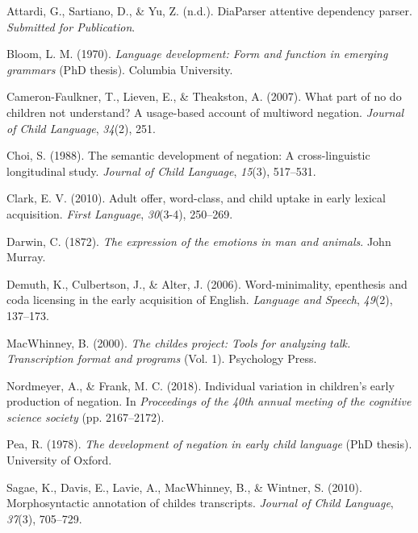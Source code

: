 \documentclass[
  english,
  man,floatsintext]{apa6}
\begin{document}
\endgroup

\hypertarget{refs}{}
\leavevmode\hypertarget{ref-diaparser}{}%
Attardi, G., Sartiano, D., \& Yu, Z. (n.d.). DiaParser attentive dependency parser. \emph{Submitted for Publication}.

\leavevmode\hypertarget{ref-bloom1970language}{}%
Bloom, L. M. (1970). \emph{Language development: Form and function in emerging grammars} (PhD thesis). Columbia University.

\leavevmode\hypertarget{ref-cameron2007part}{}%
Cameron-Faulkner, T., Lieven, E., \& Theakston, A. (2007). What part of no do children not understand? A usage-based account of multiword negation. \emph{Journal of Child Language}, \emph{34}(2), 251.

\leavevmode\hypertarget{ref-choi1988semantic}{}%
Choi, S. (1988). The semantic development of negation: A cross-linguistic longitudinal study. \emph{Journal of Child Language}, \emph{15}(3), 517--531.

\leavevmode\hypertarget{ref-clark2010adult}{}%
Clark, E. V. (2010). Adult offer, word-class, and child uptake in early lexical acquisition. \emph{First Language}, \emph{30}(3-4), 250--269.

\leavevmode\hypertarget{ref-darwin1872expression}{}%
Darwin, C. (1872). \emph{The expression of the emotions in man and animals}. John Murray.

\leavevmode\hypertarget{ref-demuth2006word}{}%
Demuth, K., Culbertson, J., \& Alter, J. (2006). Word-minimality, epenthesis and coda licensing in the early acquisition of English. \emph{Language and Speech}, \emph{49}(2), 137--173.

\leavevmode\hypertarget{ref-macwhinney2000childes}{}%
MacWhinney, B. (2000). \emph{The childes project: Tools for analyzing talk. Transcription format and programs} (Vol. 1). Psychology Press.

\leavevmode\hypertarget{ref-nordmeyer2018individual}{}%
Nordmeyer, A., \& Frank, M. C. (2018). Individual variation in children's early production of negation. In \emph{Proceedings of the 40th annual meeting of the cognitive science society} (pp. 2167--2172).

\leavevmode\hypertarget{ref-pea1978}{}%
Pea, R. (1978). \emph{The development of negation in early child language} (PhD thesis). University of Oxford.

\leavevmode\hypertarget{ref-sagae2010morphosyntactic}{}%
Sagae, K., Davis, E., Lavie, A., MacWhinney, B., \& Wintner, S. (2010). Morphosyntactic annotation of childes transcripts. \emph{Journal of Child Language}, \emph{37}(3), 705--729.
\end{document}
